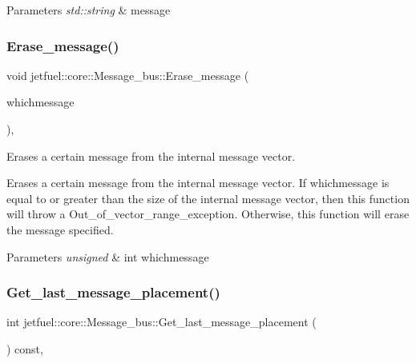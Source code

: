 \begin{DoxyParams}{Parameters}
{\em std\+::string} & message \\
\hline
\end{DoxyParams}
\mbox{\label{classjetfuel_1_1core_1_1Message__bus_abf8cc3024d814c80935c3622a4532f7b}} 
\subsubsection{\texorpdfstring{Erase\+\_\+message()}{Erase\_message()}}
{\footnotesize\ttfamily void jetfuel\+::core\+::\+Message\+\_\+bus\+::\+Erase\+\_\+message (\begin{DoxyParamCaption}\item[{const unsigned int}]{whichmessage }\end{DoxyParamCaption})\hspace{0.3cm}{\ttfamily [inline]}, {\ttfamily [protected]}}



Erases a certain message from the internal message vector. 

Erases a certain message from the internal message vector. If whichmessage is equal to or greater than the size of the internal message vector, then this function will throw a Out\+\_\+of\+\_\+vector\+\_\+range\+\_\+exception. Otherwise, this function will erase the message specified.


\begin{DoxyParams}{Parameters}
{\em unsigned} & int whichmessage \\
\hline
\end{DoxyParams}
\mbox{\label{classjetfuel_1_1core_1_1Message__bus_a1703d66bdf3faac3dd7e90edec0962f4}} 
\subsubsection{\texorpdfstring{Get\+\_\+last\+\_\+message\+\_\+placement()}{Get\_last\_message\_placement()}}
{\footnotesize\ttfamily int jetfuel\+::core\+::\+Message\+\_\+bus\+::\+Get\+\_\+last\+\_\+message\+\_\+placement (\begin{DoxyParamCaption}{ }\end{DoxyParamCaption}) const\hspace{0.3cm}{\ttfamily [inline]}, {\ttfamily [protected]}}



